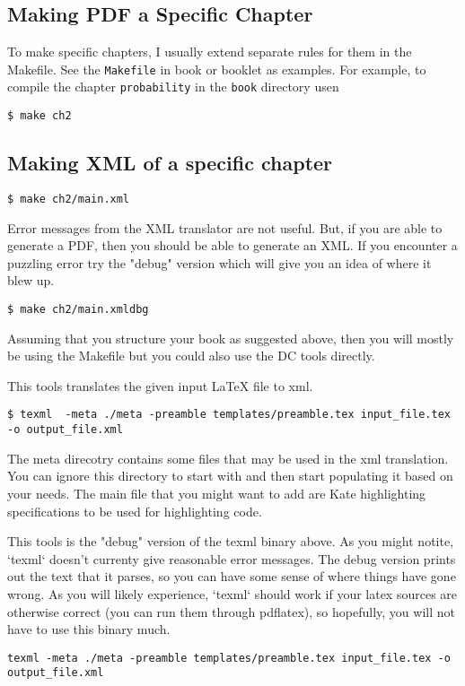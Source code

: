 \subsection{Making PDF a Specific Chapter}
To make specific chapters, I usually extend separate rules for them in the Makefile.  See the \lstinline`Makefile` in book or booklet as examples.
%
For example, to compile the chapter \lstinline`probability` in the \lstinline`book` directory usen
\begin{lstlisting}
$ make ch2
\end{lstlisting}

\subsection{Making XML of a specific chapter}

\begin{lstlisting}
$ make ch2/main.xml
\end{lstlisting}

Error messages from the XML translator are not useful.  But, if you are able to generate a PDF, then you should be able to generate an XML. If you encounter a puzzling error try the "debug" version which will give you an idea of where it blew up.   

\begin{lstlisting}
$ make ch2/main.xmldbg
\end{lstlisting}

Assuming that you structure your book as suggested above, then you will mostly be using the Makefile but you could also use the DC tools directly. 

\begin{gram}[texml]  
This tools translates the given input LaTeX file to xml.

\begin{lstlisting}
$ texml  -meta ./meta -preamble templates/preamble.tex input_file.tex -o output_file.xml
\end{lstlisting}

The meta direcotry contains some files that may be used in the xml translation.  You can ignore this directory to start with and then start populating it based on your needs.  The main file that you might want to add are Kate highlighting specifications to be used for highlighting code.
\end{gram}

\begin{gram} 
This tools is the "debug" version of the texml binary above. As you might notite, `texml` doesn't currenty give reasonable error messages.  The debug version prints out the text that it parses, so you can have some sense of where things have gone wrong.  As you will likely experience, `texml` should work if your latex sources are otherwise correct (you can run them through pdflatex), so hopefully, you will not have to use this binary much.  

\begin{lstlisting}
texml -meta ./meta -preamble templates/preamble.tex input_file.tex -o output_file.xml
\end{lstlisting}
\end{gram}

